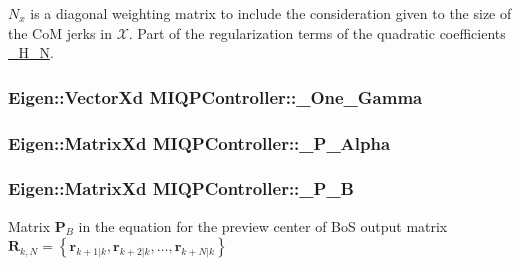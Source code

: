 $N_x$ is a diagonal weighting matrix to include the consideration given to the size of the \-Co\-M jerks in $\mathcal{X}$. \-Part of the regularization terms of the quadratic coefficients \hyperlink{classMIQPController_ab4b99d844add54fa7ad6ca6b80cab089}{\-\_\-\-H\-\_\-\-N}. \hypertarget{classMIQPController_ab3b52f6aa31c58a28e4d2edc287f7795}{
\subsubsection[{\-\_\-\-One\-\_\-\-Gamma}]{\setlength{\rightskip}{0pt plus 5cm}\-Eigen\-::\-Vector\-Xd {\bf \-M\-I\-Q\-P\-Controller\-::\-\_\-\-One\-\_\-\-Gamma}}}\label{classMIQPController_ab3b52f6aa31c58a28e4d2edc287f7795}
\hypertarget{classMIQPController_abd6c6392bc08dd2afa138e88d52cb3a7}{
\subsubsection[{\-\_\-\-P\-\_\-\-Alpha}]{\setlength{\rightskip}{0pt plus 5cm}\-Eigen\-::\-Matrix\-Xd {\bf \-M\-I\-Q\-P\-Controller\-::\-\_\-\-P\-\_\-\-Alpha}}}\label{classMIQPController_abd6c6392bc08dd2afa138e88d52cb3a7}
\hypertarget{classMIQPController_a848852d659dff4a566a8dca57819587d}{
\subsubsection[{\-\_\-\-P\-\_\-\-B}]{\setlength{\rightskip}{0pt plus 5cm}\-Eigen\-::\-Matrix\-Xd {\bf \-M\-I\-Q\-P\-Controller\-::\-\_\-\-P\-\_\-\-B}}}\label{classMIQPController_a848852d659dff4a566a8dca57819587d}
\-Matrix $\mathbf{P}_B$ in the equation for the preview center of \-Bo\-S output matrix $\mathbf{R}_{k,N} = \left\{ \mathbf{r}_{k+1|k}, \mathbf{r}_{k+2|k}, \dots, \mathbf{r}_{k+N|k} \right\}$

